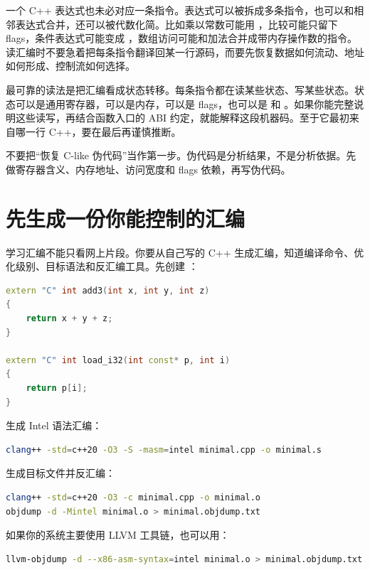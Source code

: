 一个 C++ 表达式也未必对应一条指令。表达式可以被拆成多条指令，也可以和相邻表达式合并，还可以被代数化简。比如乘以常数可能用 ，比较可能只留下 flags，条件表达式可能变成 ，数组访问可能和加法合并成带内存操作数的指令。读汇编时不要急着把每条指令翻译回某一行源码，而要先恢复数据如何流动、地址如何形成、控制流如何选择。

最可靠的读法是把汇编看成状态转移。每条指令都在读某些状态、写某些状态。状态可以是通用寄存器，可以是内存，可以是 flags，也可以是  和 。如果你能完整说明这些读写，再结合函数入口的 ABI 约定，就能解释这段机器码。至于它最初来自哪一行 C++，要在最后再谨慎推断。

\begin{warningbox}
不要把“恢复 C-like 伪代码”当作第一步。伪代码是分析结果，不是分析依据。先做寄存器含义、内存地址、访问宽度和 flags 依赖，再写伪代码。
\end{warningbox}

\section{先生成一份你能控制的汇编}

学习汇编不能只看网上片段。你要从自己写的 C++ 生成汇编，知道编译命令、优化级别、目标语法和反汇编工具。先创建 ：

\begin{lstlisting}[language=C++]
extern "C" int add3(int x, int y, int z)
{
    return x + y + z;
}

extern "C" int load_i32(int const* p, int i)
{
    return p[i];
}
\end{lstlisting}

生成 Intel 语法汇编：

\begin{lstlisting}[language=bash]
clang++ -std=c++20 -O3 -S -masm=intel minimal.cpp -o minimal.s
\end{lstlisting}

生成目标文件并反汇编：

\begin{lstlisting}[language=bash]
clang++ -std=c++20 -O3 -c minimal.cpp -o minimal.o
objdump -d -Mintel minimal.o > minimal.objdump.txt
\end{lstlisting}

如果你的系统主要使用 LLVM 工具链，也可以用：

\begin{lstlisting}[language=bash]
llvm-objdump -d --x86-asm-syntax=intel minimal.o > minimal.objdump.txt
\end{lstlisting}

